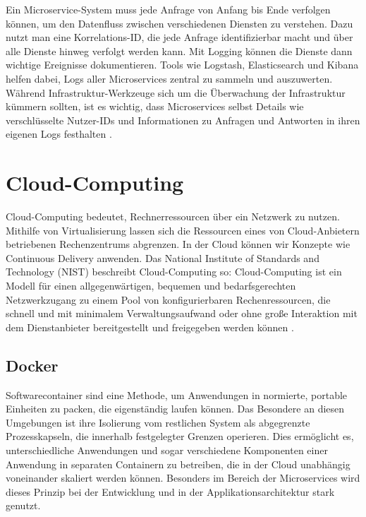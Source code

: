{Ein Microservice-System muss jede Anfrage von Anfang bis Ende verfolgen können, um den Datenfluss zwischen verschiedenen Diensten zu verstehen. Dazu nutzt man eine Korrelations-ID, die jede Anfrage identifizierbar macht und über alle Dienste hinweg verfolgt werden kann. Mit Logging können die Dienste dann wichtige Ereignisse dokumentieren. Tools wie Logstash, Elasticsearch und Kibana helfen dabei, Logs aller Microservices zentral zu sammeln und auszuwerten. Während Infrastruktur-Werkzeuge sich um die Überwachung der Infrastruktur kümmern sollten, ist es wichtig, dass Microservices selbst Details wie verschlüsselte Nutzer-IDs und Informationen zu Anfragen und Antworten in ihren eigenen Logs festhalten \cite[S. 244 - 249]{wolff} \cite[S.109-110]{fowlersusan}.

%
%

\pagebreak 
\section{Cloud-Computing}



Cloud-Computing bedeutet, Rechnerressourcen über ein Netzwerk zu nutzen. Mithilfe von Virtualisierung lassen sich die Ressourcen eines von Cloud-Anbietern betriebenen Rechenzentrums abgrenzen. In der Cloud können wir Konzepte wie Continuous Delivery anwenden. Das National Institute of Standards and Technology (NIST) beschreibt Cloud-Computing so: Cloud-Computing ist ein Modell für einen allgegenwärtigen, bequemen und bedarfsgerechten Netzwerkzugang zu einem Pool von konfigurierbaren Rechenressourcen, die schnell und mit minimalem Verwaltungsaufwand oder ohne große Interaktion mit dem Dienstanbieter bereitgestellt und freigegeben werden können \cite[S. 20]{stender} \cite[S.19-22]{riti}.

\subsection{Docker}

Softwarecontainer sind eine Methode, um Anwendungen in normierte, portable Einheiten zu packen, die eigenständig laufen können. Das Besondere an diesen Umgebungen ist ihre Isolierung vom restlichen System als abgegrenzte Prozesskapseln, die innerhalb festgelegter Grenzen operieren. Dies ermöglicht es, unterschiedliche Anwendungen und sogar verschiedene Komponenten einer Anwendung in separaten Containern zu betreiben, die in der Cloud unabhängig voneinander skaliert werden können. Besonders im Bereich der Microservices wird dieses Prinzip bei der Entwicklung und in der Applikationsarchitektur stark genutzt.

}
